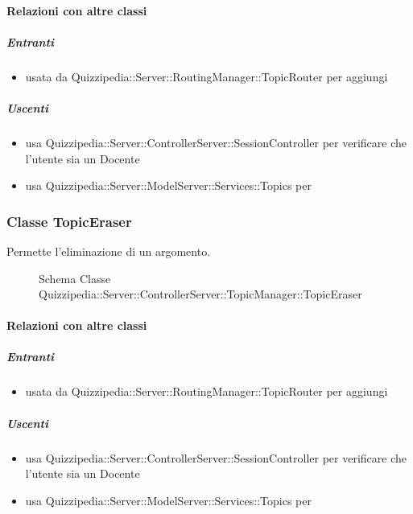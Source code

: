 \paragraph{Relazioni con altre classi}
\subparagraph{Entranti}
\begin{itemize}
\item usata da Quizzipedia::Server::RoutingManager::TopicRouter per aggiungi
\end{itemize}
\subparagraph{Uscenti}
\begin{itemize}
\item usa Quizzipedia::Server::ControllerServer::SessionController per verificare che l'utente sia un Docente
\item usa Quizzipedia::Server::ModelServer::Services::Topics per 
\end{itemize}
\subsubsection{Classe TopicEraser}
Permette l'eliminazione di un argomento.
\begin{figure}[H]
\centering
\noindent{}
\caption[Schema Classe TopicEraser]{Schema Classe Quizzipedia::Server::ControllerServer::TopicManager::TopicEraser}
\end{figure}
\paragraph{Relazioni con altre classi}
\subparagraph{Entranti}
\begin{itemize}
\item usata da Quizzipedia::Server::RoutingManager::TopicRouter per aggiungi
\end{itemize}
\subparagraph{Uscenti}
\begin{itemize}
\item usa Quizzipedia::Server::ControllerServer::SessionController per verificare che l'utente sia un Docente
\item usa Quizzipedia::Server::ModelServer::Services::Topics per 
\end{itemize}
